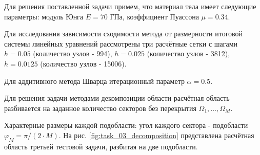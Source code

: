 \documentclass[a4paper]{article}
\begin{document}
Для решения поставленной задачи примем, что материал тела имеет следующие параметры: модуль Юнга $E = 70$ ГПа, коэффициент Пуассона $\mu = 0.34$. 

Для исследования зависимости сходимости метода от размерности итоговой системы линейных уравнений рассмотрены три расчётные сетки с шагами $h = 0.05$ (количество узлов - 994), $h = 0.025$ (количество узлов - 3812), $h = 0.0125$ (количество узлов - 15006).

Для аддитивного метода Шварца итерационный параметр $\alpha = 0.5$.

\newpage

Для решения задачи методами декомпозиции области расчётная область разбивается на заданное количество секторов без перекрытия $\Omega_1, \ldots, \Omega_M$. 

Характерные размеры каждой подобласти: угол каждого сектора - подобласти $\varphi_M = \pi / (2 \cdot M)$. На рис. \ref{fig:task_03_decomposition} представлена расчётная область третьей тестовой задачи, разбитая на две подобласти.
\end{document}
